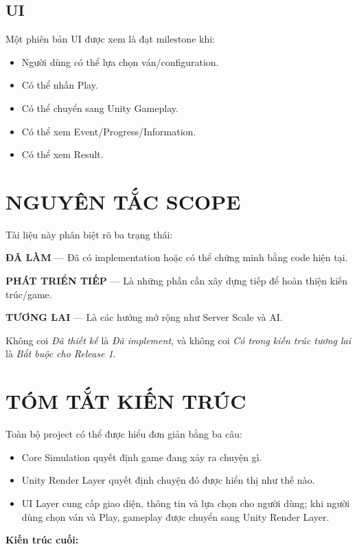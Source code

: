 \documentclass[12pt,a4paper]{article}
\begin{document}
\subsection*{UI}

Một phiên bản UI được xem là đạt milestone khi:
\begin{itemize}[nosep]
  \item Người dùng có thể lựa chọn ván/configuration.
  \item Có thể nhấn Play.
  \item Có thể chuyển sang Unity Gameplay.
  \item Có thể xem Event/Progress/Information.
  \item Có thể xem Result.
\end{itemize}

\section{NGUYÊN TẮC SCOPE}

Tài liệu này phân biệt rõ ba trạng thái:

\textbf{ĐÃ LÀM} --- Đã có implementation hoặc có thể chứng minh bằng code hiện tại.

\textbf{PHÁT TRIỂN TIẾP} --- Là những phần cần xây dựng tiếp để hoàn thiện kiến trúc/game.

\textbf{TƯƠNG LAI} --- Là các hướng mở rộng như Server Scale và AI.

Không coi \textit{Đã thiết kế} là \textit{Đã implement}, và không coi \textit{Có trong kiến trúc tương lai} là \textit{Bắt buộc cho Release 1}.

\section{TÓM TẮT KIẾN TRÚC}

Toàn bộ project có thể được hiểu đơn giản bằng ba câu:

\begin{itemize}[nosep]
  \item Core Simulation quyết định game đang xảy ra chuyện gì.
  \item Unity Render Layer quyết định chuyện đó được hiển thị như thế nào.
  \item UI Layer cung cấp giao diện, thông tin và lựa chọn cho người dùng; khi người dùng chọn ván và Play, gameplay được chuyển sang Unity Render Layer.
\end{itemize}

\textbf{Kiến trúc cuối:}
\end{document}
